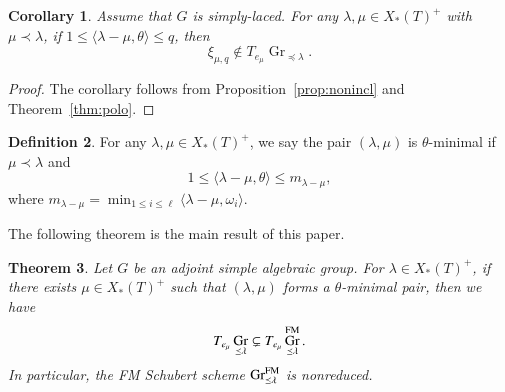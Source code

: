 \documentclass[a4paper, 12pt]{amsart}
\newtheorem{theorem}{Theorem}[section]
\newtheorem{corollary}[theorem]{Corollary}
\theoremstyle{definition}
\newtheorem{definition}[theorem]{Definition}
\newcommand{\la}{\langle}
\newcommand{\ra}{\rangle}
\DeclareMathOperator{\Gr}{\mathrm{Gr}}
\begin{document}
\begin{corollary}\label{cor:polo}
Assume that $G$ is simply-laced.
For  any $\lambda, \mu\in X_*(T)^+$ with $\mu \prec \lambda$, 
if $1\leq\la\lambda-\mu,\theta\ra\leq q$, then
$$\xi_{\mu,q}\notin T_{e_\mu}\Gr_{\preceq\lambda}.$$
\end{corollary}

\begin{proof}
The corollary follows from Proposition~\ref{prop:nonincl} and
Theorem~\ref{thm:polo}.
\end{proof}

\begin{definition}\label{def:admissible}
For any $\lambda,\mu\in X_*(T)^+$, we say the pair $(\lambda,\mu)$ is
$\theta$-minimal if $\mu\prec\lambda$ and
\begin{equation}\label{eq:question}
1\leq\langle\lambda-\mu,\theta\rangle
\leq m_{\lambda-\mu},
\end{equation}
where $m_{\lambda-\mu}
=\min_{1\leq i\leq\ell}\langle\lambda-\mu,\omega_i\rangle$. 
\end{definition}

The following theorem is the main result of this paper.\nopagebreak
\begin{theorem}\label{thm:main1}
Let $G$ be an adjoint simple algebraic group. For $\lambda \in X_*(T)^+$, if there exists $\mu\in X_*(T)^+$ such that  $(\lambda, \mu)$ forms a $\theta$-minimal pair, then we have
\[
T_{e_\mu}\Gr_{\preceq\lambda}\subsetneq T_{e_\mu}\Gr^{\rm FM}_{\preceq\lambda}.
\]
In particular, the FM Schubert scheme $\Gr^{\rm FM}_{\preceq\lambda}$ is nonreduced.
\end{theorem}
\end{document}
